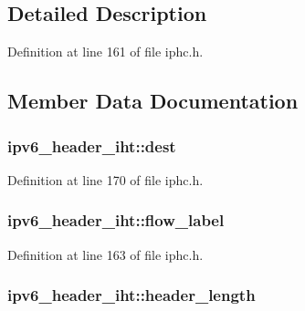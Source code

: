 \subsection{Detailed Description}


Definition at line 161 of file iphc.\+h.



\subsection{Member Data Documentation}
\subsubsection[{\texorpdfstring{dest}{dest}}]{ ipv6\+\_\+header\+\_\+iht\+::dest}\hypertarget{structipv6__header__iht_ac555658b79373c595910859b873c4db3}{}\label{structipv6__header__iht_ac555658b79373c595910859b873c4db3}


Definition at line 170 of file iphc.\+h.

\subsubsection[{\texorpdfstring{flow\+\_\+label}{flow_label}}]{ ipv6\+\_\+header\+\_\+iht\+::flow\+\_\+label}\hypertarget{structipv6__header__iht_a096db90d3dac8fc8ad84647c7f7ad569}{}\label{structipv6__header__iht_a096db90d3dac8fc8ad84647c7f7ad569}


Definition at line 163 of file iphc.\+h.

\subsubsection[{\texorpdfstring{header\+\_\+length}{header_length}}]{ ipv6\+\_\+header\+\_\+iht\+::header\+\_\+length}\hypertarget{structipv6__header__iht_a134cf93f9a622bef68ddb915538a594e}{}\label{structipv6__header__iht_a134cf93f9a622bef68ddb915538a594e}


